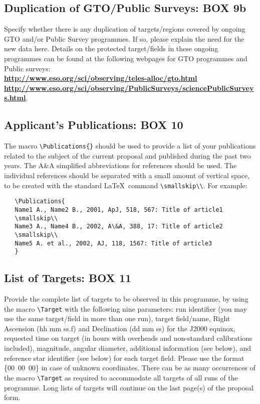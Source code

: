 \documentclass{article}
\begin{document}
\subsection{Duplication of GTO/Public Surveys: {\bf BOX 9b}}

Specify whether there is any duplication of targets/regions covered by ongoing GTO and/or Public Survey programmes. 
If so, please explain the need for the new data here. Details on the protected target/fields in these
ongoing programmes can be found at the following webpages for GTO programmes and Public surveys: \\
\href{http://www.eso.org/sci/observing/teles-alloc/gto.html}
{\bf  \underline{http://www.eso.org/sci/observing/teles-alloc/gto.html}}\\
\href{http://www.eso.org/sci/observing/PublicSurveys/sciencePublicSurveys.html}
{\bf \underline{http://www.eso.org/sci/observing/PublicSurveys/sciencePublicSurveys.html}}.

\subsection{Applicant's  Publications: {\bf BOX 10}}

The macro \verb|\Publications{}| should be used to 
provide a list of your publications related to the
subject of the current proposal and published during the past two
years. The A\&A simplified abbreviations for references should be
used. The individual references should be separated with a small
amount of vertical space, to be created with the standard \LaTeX\
command \verb|\smallskip\\|. For example:
\begin{verbatim}
   \Publications{
   Name1 A., Name2 B., 2001, ApJ, 518, 567: Title of article1
   \smallskip\\
   Name3 A., Name4 B., 2002, A\&A, 388, 17: Title of article2
   \smallskip\\
   Name5 A. et al., 2002, AJ, 118, 1567: Title of article3
   }
\end{verbatim}

\subsection{List of Targets: {\bf BOX 11}}
  
Provide the complete list of targets to be observed in this programme,
by using the macro \verb|\Target| 
with the following nine parameters: run identifier (you may use the same
target/field in more than one run), target field/name, Right Ascension
(hh mm ss.f) and Declination (dd mm ss) for the J2000 equinox, requested time on target (in hours
with overheads and non-standard calibrations included), magnitude, angular diameter,
additional information (see below), and reference star identifier
(see below) for each target field.  Please use the format \{00~00~00\}
in case of unknown coordinates. There can be as many occurrences of
the macro \verb|\Target| as required to accommodate all targets of all
runs of the programme. Long lists of targets will continue
on the last page(s) of the proposal form.
\end{document}
